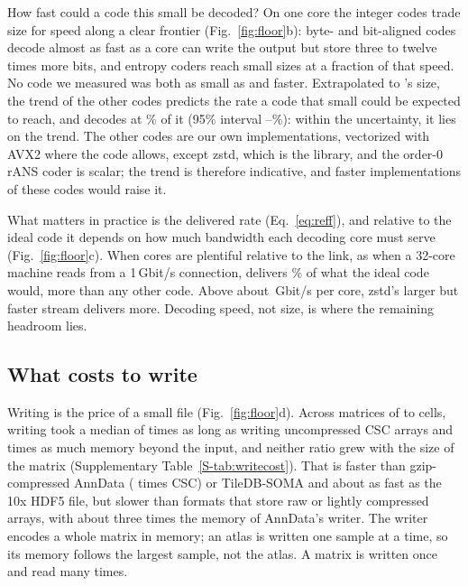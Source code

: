 How fast could a code this small be decoded? On one core the integer codes trade size for speed along a clear frontier
(Fig.~\ref{fig:floor}b): byte- and bit-aligned codes decode almost as fast as a core can write the output but store three
to twelve times more bits, and entropy coders reach small sizes at a fraction of that speed. No code we measured was both
as small as \sone{} and faster. Extrapolated to \sone's size, the trend of the other codes predicts the rate a code that
small could be expected to reach, and \sone{} decodes at \% of it (95\% interval
--\%): within the uncertainty, it lies on the trend. The other codes are our own
implementations, vectorized with AVX2 where the code allows, except zstd, which is the library, and the order-0 rANS
coder is scalar; the trend is therefore indicative, and faster implementations of these codes would raise it.

What matters in practice is the delivered rate (Eq.~\ref{eq:reff}), and relative to the ideal code it depends on how much
bandwidth each decoding core must serve (Fig.~\ref{fig:floor}c). When cores are plentiful relative to the link, as when a
32-core machine reads from a 1\,Gbit/s connection, \sone{} delivers \% of what the ideal code would, more
than any other code. Above about \,Gbit/s per core, zstd's larger but faster stream delivers more.
Decoding speed, not size, is where the remaining headroom lies.

\subsection{What \sone{} costs to write}

Writing is the price of a small file (Fig.~\ref{fig:floor}d). Across  matrices of
 to  cells, writing \sone{} took a median of 
times as long as writing uncompressed CSC arrays and  times as much memory beyond the input, and
neither ratio grew with the size of the matrix (Supplementary Table~\ref{S-tab:writecost}). That is faster than gzip-compressed AnnData ( times
CSC) or TileDB-SOMA and about as fast as the 10x HDF5 file, but slower than formats that store raw or lightly compressed
arrays, with about three times the memory of AnnData's writer. The writer encodes a whole matrix in memory; an atlas
is written one sample at a time, so its memory follows the largest sample, not the atlas. A matrix is written once and
read many times.

